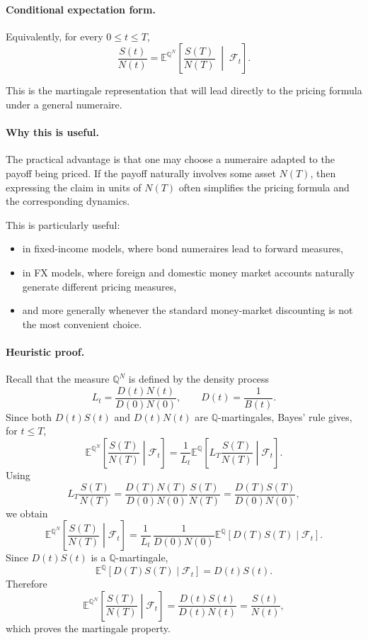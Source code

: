 \documentclass[11pt]{article}
\newcommand{\Qbb}{\mathbb{Q}}
\newcommand{\E}{\mathbb{E}}
\theoremstyle{definition}
\theoremstyle{plain}
\begin{document}
\paragraph{Conditional expectation form.}
Equivalently, for every \(0\le t\le T\),
\[
\frac{S(t)}{N(t)}
=
\E^{\Qbb^N}\!\left[
\frac{S(T)}{N(T)}
\;\middle|\;
\mathcal{F}_t
\right].
\]

This is the martingale representation that will lead directly to the
pricing formula under a general numeraire.

\paragraph{Why this is useful.}
The practical advantage is that one may choose a numeraire adapted to
the payoff being priced.
If the payoff naturally involves some asset \(N(T)\), then expressing
the claim in units of \(N(T)\) often simplifies the pricing formula and
the corresponding dynamics.

This is particularly useful:
\begin{itemize}[leftmargin=1.4em]
\item in fixed-income models, where bond numeraires lead to forward measures,
\item in FX models, where foreign and domestic money market accounts
naturally generate different pricing measures,
\item and more generally whenever the standard money-market discounting
is not the most convenient choice.
\end{itemize}

\paragraph{Heuristic proof.}
Recall that the measure \(\Qbb^N\) is defined by the density process
\[
L_t
=
\frac{D(t)N(t)}{D(0)N(0)},
\qquad D(t)=\frac1{B(t)}.
\]
Since both \(D(t)S(t)\) and \(D(t)N(t)\) are \(\Qbb\)-martingales, Bayes'
rule gives, for \(t\le T\),
\[
\E^{\Qbb^N}\!\left[\frac{S(T)}{N(T)}\middle|\mathcal{F}_t\right]
=
\frac{1}{L_t}
\E^\Qbb\!\left[L_T\frac{S(T)}{N(T)}\middle|\mathcal{F}_t\right].
\]
Using
\[
L_T\frac{S(T)}{N(T)}
=
\frac{D(T)N(T)}{D(0)N(0)}\frac{S(T)}{N(T)}
=
\frac{D(T)S(T)}{D(0)N(0)},
\]
we obtain
\[
\E^{\Qbb^N}\!\left[\frac{S(T)}{N(T)}\middle|\mathcal{F}_t\right]
=
\frac{1}{L_t}\,
\frac{1}{D(0)N(0)}
\E^\Qbb\!\left[D(T)S(T)\middle|\mathcal{F}_t\right].
\]
Since \(D(t)S(t)\) is a \(\Qbb\)-martingale,
\[
\E^\Qbb\!\left[D(T)S(T)\middle|\mathcal{F}_t\right]=D(t)S(t).
\]
Therefore
\[
\E^{\Qbb^N}\!\left[\frac{S(T)}{N(T)}\middle|\mathcal{F}_t\right]
=
\frac{D(t)S(t)}{D(t)N(t)}
=
\frac{S(t)}{N(t)},
\]
which proves the martingale property.
\end{document}
